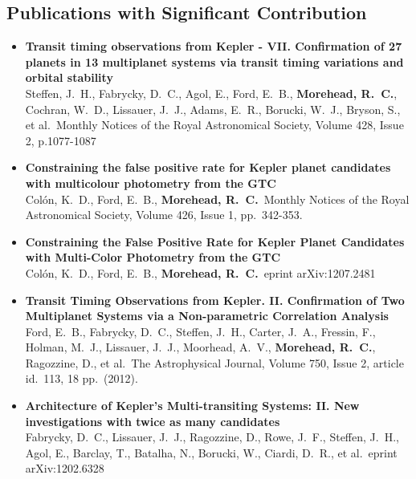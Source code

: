 \documentclass[11pt,letterpaper,sans]{moderncv} %
\begin{document}
\subsection{Publications with Significant Contribution}

\begin{itemize}
 \item \textbf{ Transit timing observations from Kepler - VII. Confirmation 
of 27 planets in 13 multiplanet systems via transit timing variations and 
orbital stability } \\ Steffen, J.~H., Fabrycky, D.~C., Agol, E., Ford, 
E.~B., \textbf{Morehead, R.~C.}, Cochran, W.~D., Lissauer, J.~J., Adams, E.~R., 
Borucki, W.~J., Bryson, S., et al.\ Monthly Notices of the Royal 
Astronomical Society, Volume 428, Issue 2, p.1077-1087 \\ 

 \item \textbf{ Constraining the false positive rate for Kepler planet 
candidates with multicolour photometry from the GTC } \\ Col{\'o}n, K.~D., 
Ford, E.~B., \textbf{Morehead, R.~C.}\ Monthly Notices of the Royal Astronomical 
Society, Volume 426, Issue 1, pp.~342-353.\ \\ 

 \item \textbf{ Constraining the False Positive Rate for Kepler Planet 
Candidates with Multi-Color Photometry from the GTC } \\ Col{\'o}n, K.~D., 
Ford, E.~B., \textbf{Morehead, R.~C.}\ eprint arXiv:1207.2481 \\ 

 \item \textbf{ Transit Timing Observations from Kepler. II. Confirmation 
of Two Multiplanet Systems via a Non-parametric Correlation Analysis } \\ 
Ford, E.~B., Fabrycky, D.~C., Steffen, J.~H., Carter, J.~A., Fressin, F., 
Holman, M.~J., Lissauer, J.~J., Moorhead, A.~V., \textbf{Morehead, R.~C.}, 
Ragozzine, D., et al.\ The Astrophysical Journal, Volume 750, Issue 2, 
article id.~113, 18 pp.~(2012).\ \\ 

 \item \textbf{ Architecture of Kepler's Multi-transiting Systems: II. New 
investigations with twice as many candidates } \\ Fabrycky, D.~C., 
Lissauer, J.~J., Ragozzine, D., Rowe, J.~F., Steffen, J.~H., Agol, E., 
Barclay, T., Batalha, N., Borucki, W., Ciardi, D.~R., et al.\ eprint 
arXiv:1202.6328 \\ 



\end{itemize}
\end{document}

